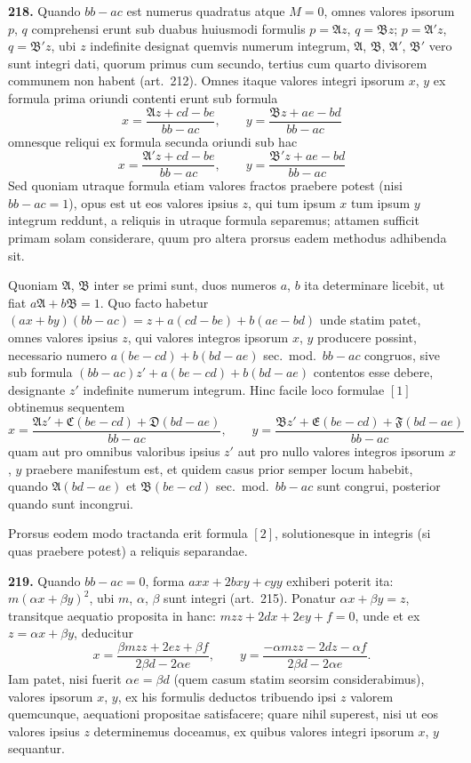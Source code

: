 \documentclass[12pt,a4paper]{article}
\theoremstyle{plain}
\theoremstyle{definition}
\theoremstyle{remark}
\begin{document}
\textbf{218.}
Quando $bb-ac$ est numerus quadratus atque $M=0$, omnes valores ipsorum $p$, $q$ comprehensi erunt sub duabus huiusmodi formulis $p=\mathfrak{A}z$, $q=\mathfrak{B}z$; $p=\mathfrak{A}'z$, $q=\mathfrak{B}'z$, ubi $z$ indefinite designat quemvis numerum integrum, $\mathfrak{A}$, $\mathfrak{B}$, $\mathfrak{A}'$, $\mathfrak{B}'$ vero sunt integri dati, quorum primus cum secundo, tertius cum quarto divisorem communem non habent (art.\ 212). Omnes itaque valores integri ipsorum $x$, $y$ ex formula prima oriundi contenti erunt sub formula
\begin{equation*}
\tag{1}
x=\frac{\mathfrak{A}z+cd-be}{bb-ac},\qquad y=\frac{\mathfrak{B}z+ae-bd}{bb-ac}
\end{equation*}
omnesque reliqui ex formula secunda oriundi sub hac
\begin{equation*}
\tag{2}
x=\frac{\mathfrak{A}'z+cd-be}{bb-ac},\qquad y=\frac{\mathfrak{B}'z+ae-bd}{bb-ac}
\end{equation*}
Sed quoniam utraque formula etiam valores fractos praebere potest (nisi $bb-ac=1$), opus est ut eos valores ipsius $z$, qui tum ipsum $x$ tum ipsum $y$ integrum reddunt, a reliquis in utraque formula separemus; attamen sufficit primam solam considerare, quum pro altera prorsus eadem methodus adhibenda sit.

Quoniam $\mathfrak{A}$, $\mathfrak{B}$ inter se primi sunt, duos numeros $a$, $b$ ita determinare licebit, ut fiat $a\mathfrak{A}+b\mathfrak{B}=1$. Quo facto habetur $(ax+by)(bb-ac)=z+a(cd-be)+b(ae-bd)$ unde statim patet, omnes valores ipsius $z$, qui valores integros ipsorum $x$, $y$ producere possint, necessario numero $a(be-cd)+b(bd-ae)$ sec.\ mod.\ $bb-ac$ congruos, sive sub formula $(bb-ac)z'+a(be-cd)+b(bd-ae)$ contentos esse debere, designante $z'$ indefinite numerum integrum. Hinc facile loco formulae $[1]$ obtinemus sequentem
\[
x=\frac{\mathfrak{A}z'+\mathfrak{C}(be-cd)+\mathfrak{D}(bd-ae)}{bb-ac},\qquad y=\frac{\mathfrak{B}z'+\mathfrak{E}(be-cd)+\mathfrak{F}(bd-ae)}{bb-ac}
\]
quam aut pro omnibus valoribus ipsius $z'$ aut pro nullo valores integros ipsorum $x$, $y$ praebere manifestum est, et quidem casus prior semper locum habebit, quando $\mathfrak{A}(bd-ae)$ et $\mathfrak{B}(be-cd)$ sec.\ mod.\ $bb-ac$ sunt congrui, posterior quando sunt incongrui.

Prorsus eodem modo tractanda erit formula $[2]$, solutionesque in integris (si quas praebere potest) a reliquis separandae.

\textbf{219.}
Quando $bb-ac=0$, forma $axx+2bxy+cyy$ exhiberi poterit ita: $m(\alpha x+\beta y)^2$, ubi $m$, $\alpha$, $\beta$ sunt integri (art.\ 215). Ponatur $\alpha x+\beta y=z$, transitque aequatio proposita in hanc: $mzz+2dx+2ey+f=0$, unde et ex $z=\alpha x+\beta y$, deducitur
\[
x=\frac{\beta mzz+2ez+\beta f}{2\beta d-2\alpha e},\qquad y=\frac{-\alpha mzz-2dz-\alpha f}{2\beta d-2\alpha e}.
\]
Iam patet, nisi fuerit $\alpha e=\beta d$ (quem casum statim seorsim considerabimus), valores ipsorum $x$, $y$, ex his formulis deductos tribuendo ipsi $z$ valorem quemcunque, aequationi propositae satisfacere; quare nihil superest, nisi ut eos valores ipsius $z$ determinemus doceamus, ex quibus valores integri ipsorum $x$, $y$ sequantur.
\end{document}
